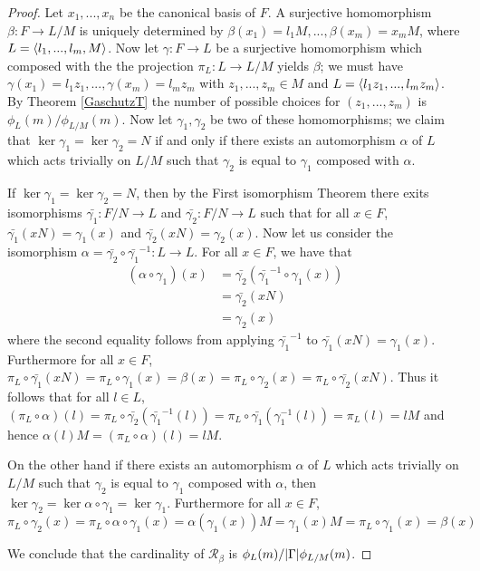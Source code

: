 \begin{proof}
    Let $x_1,..., x_n$ be the canonical basis of $F$. 
    A surjective homomorphism $\beta : F \longrightarrow L/M$ is uniquely determined by $\beta(x_1) = l_1M, ..., \beta(x_m) = x_mM$, where $L = \langle l_1,...,l_m, M \rangle$. 
    Now let $\gamma : F \longrightarrow L$ be a surjective homomorphism which composed with the the projection $\pi_L \colon L \longrightarrow L/M$ yields $\beta$; we must have $\gamma(x_1) = l_1z_1,...,\gamma(x_m)=l_mz_m$ with $z_1,..., z_m \in M$ and $L = \langle l_1z_1,...,l_mz_m \rangle$. By Theorem \ref{GaschutzT} the number of possible choices for $(z_1,...,z_m)$ is $\phi_L(m)/\phi_{L/M}(m)$. Now let $\gamma_1, \gamma_2$ be two of these homomorphisms; we claim that $\ker \gamma_1 = \ker \gamma_2 = N$ if and only if there exists an automorphism $\alpha$ of $L$ which acts trivially on $L/M$ such that $\gamma_2$ is equal to $\gamma_1$ composed with $\alpha$. 
    
    If $\ker \gamma_1 = \ker \gamma_2 = N$, then by the First isomorphism Theorem there exits isomorphisms $\bar{\gamma_1} \colon F/N \rightarrow L$ and $\bar{\gamma_2} \colon F/N \rightarrow L$ such that for all $x \in F$, $\bar{\gamma_1}(xN) = \gamma_1(x)$ and $\bar{\gamma_2}(xN) = \gamma_2(x)$. Now let us consider the isomorphism $\alpha = \bar{\gamma_2} \circ \bar{\gamma_1}^{-1} \colon L \rightarrow L.$ For all $x \in F$, we have that
    \begin{align*}
        (\alpha \circ \gamma_1)(x) &=  \bar{\gamma_2} (\bar{\gamma_1}^{-1}\circ \gamma_1(x)) \\
        &= \bar{\gamma_2}(xN) \\
        &= \gamma_2(x)
    \end{align*}
    where the second equality follows from applying $\bar{\gamma_1}^{-1}$ to $\bar{\gamma_1}(xN) = \gamma_1(x)$. Furthermore for all $x \in F$,
    $\pi_L \circ \bar{\gamma_1}(xN) = \pi_L \circ \gamma_1(x) = \beta(x) = \pi_L \circ \gamma_2(x) = \pi_L \circ \bar{\gamma_2}(xN)$. Thus it follows that for all $l \in L$, $(\pi_L \circ \alpha)(l) = \pi_L \circ \bar{\gamma_2}(\bar{\gamma_1}^{-1}(l)) = \pi_L \circ \bar{\gamma_1}(\gamma_1^{-1}(l)) = \pi_L(l) = lM$ and hence $\alpha(l)M = (\pi_L \circ \alpha)(l) = lM$.

    On the other hand if there exists an automorphism $\alpha$ of $L$ which acts trivially on $L/M$ such that $\gamma_2$ is equal to $\gamma_1$ composed with $\alpha$, then $\ker \gamma_2 = \ker \alpha \circ \gamma_1 = \ker \gamma_1$. Furthermore for all $x \in F$, $\pi_L \circ \gamma_2(x) = \pi_L \circ \alpha \circ \gamma_1(x) = \alpha(\gamma_1(x))M = \gamma_1(x)M = \pi_L \circ \gamma_1(x) = \beta(x)$

    We conclude that the cardinality of $\mathscr{R}_\beta$ is $\phi_L(m)/| \Gamma |\phi_{L/M}(m)$.
\end{proof}

